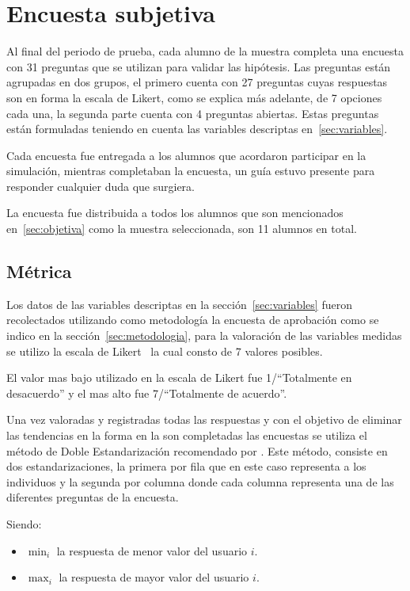 \section{Encuesta subjetiva}

Al final del periodo de prueba, cada alumno de la muestra completa una encuesta
con 31 preguntas que se utilizan para validar las hipótesis. Las preguntas están
agrupadas en dos grupos, el primero cuenta con 27 preguntas cuyas respuestas son
en forma la escala de  Likert, como se explica más adelante, de 7 opciones cada
una, la segunda parte cuenta con 4 preguntas abiertas. Estas preguntas están
formuladas teniendo en cuenta las variables descriptas en~\ref{sec:variables}.

Cada encuesta fue entregada a los alumnos que acordaron participar en la
simulación, mientras completaban la encuesta, un guía estuvo presente para
responder cualquier duda que surgiera.

La encuesta fue distribuida a todos los alumnos que son mencionados
en~\ref{sec:objetiva} como la muestra seleccionada, son 11 alumnos en total.

\subsection{Métrica}
\label{sec:metrica}

Los datos de las variables descriptas en la sección~\ref{sec:variables} fueron
recolectados utilizando como metodología la encuesta de aprobación como se
indico en la sección~\ref{sec:metodologia}, para la valoración de las variables
medidas se utilizo la escala de Likert~\cite{Allen:2007} la cual consto de 7
valores posibles.

El valor mas bajo utilizado en la escala de Likert fue 1/``Totalmente en
desacuerdo'' y el mas alto fue 7/``Totalmente de acuerdo''.

Una vez valoradas y registradas todas las respuestas y con el objetivo de
eliminar las tendencias en la forma en la son completadas las encuestas
\cite{Fischer2010} se utiliza el método de Doble Estandarización recomendado por
\cite{Pagolu2011}. Este método, consiste en dos estandarizaciones, la primera
por fila que en este caso representa a los individuos y la segunda por columna
donde cada columna representa una de las diferentes preguntas de la encuesta.

Siendo:
\begin{itemize}
	\item $\min_i$ la respuesta de menor valor del usuario $i$.
	\item $\max_i$ la respuesta de mayor valor del usuario $i$.
\end{itemize}

